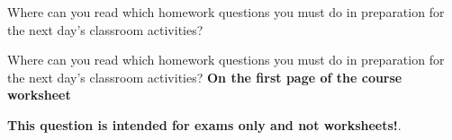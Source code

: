 

Where can you read which homework questions you must do in preparation for the next day's classroom activities?







Where can you read which homework questions you must do in preparation for the next day's classroom activities? {\bf On the first page of the course worksheet}







{\bf This question is intended for exams only and not worksheets!}.



